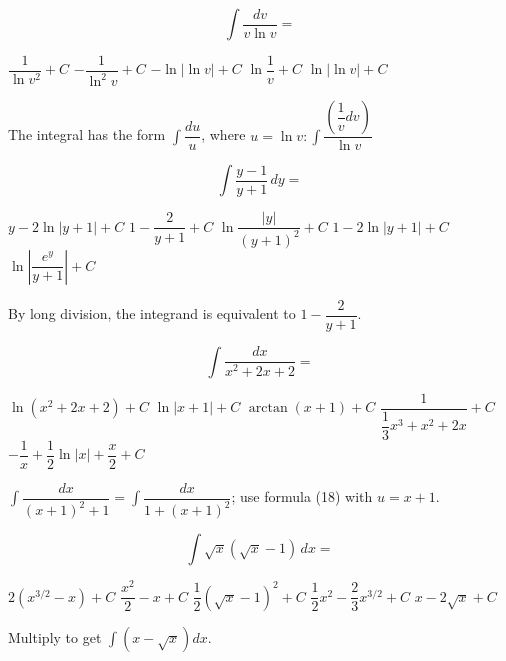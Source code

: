 \question
\[
\displaystyle\int \dfrac{d v}{v \ln v}=
\]
\begin{choices}
  \choice $\dfrac{1}{\ln v^{2}}+C$
  \choice $-\dfrac{1}{\ln ^{2} v}+C$
  \choice $-\ln |\ln v|+C$
  \choice $\ln \dfrac{1}{v}+C$
  \CorrectChoice $\ln |\ln v|+C$
\end{choices}
\begin{solution}
The integral has the form $\displaystyle\int \dfrac{d u}{u}$, where $u=\ln v: \displaystyle\int \dfrac{\left(\dfrac{1}{v} d v\right)}{\ln v}$
\end{solution}



\newpage


\question
\[
\displaystyle\int \dfrac{y-1}{y+1} \,dy=
\]
\begin{choices}
  \CorrectChoice $y-2 \ln |y+1|+C$
  \choice $1-\dfrac{2}{y+1}+C$
  \choice $\ln \dfrac{|y|}{(y+1)^{2}}+C$
  \choice $1-2 \ln |y+1|+C$
  \choice $\ln \left|\dfrac{e^{y}}{y+1}\right|+C$
\end{choices}
\begin{solution}
By long division, the integrand is equivalent to $1-\dfrac{2}{y+1}$.
\end{solution}

\question
\[
\displaystyle\int \dfrac{d x}{x^{2}+2 x+2}=
\]
\begin{choices}
  \choice $\ln \left(x^{2}+2 x+2\right)+C$
  \choice $\ln |x+1|+C$
  \CorrectChoice $\arctan (x+1)+C$
  \choice $\dfrac{1}{\dfrac{1}{3} x^{3}+x^{2}+2 x}+C$
  \choice $-\dfrac{1}{x}+\dfrac{1}{2} \ln |x|+\dfrac{x}{2}+C$
\end{choices}
\begin{solution}
$\displaystyle\int \dfrac{d x}{(x+1)^{2}+1}=\displaystyle\int \dfrac{d x}{1+(x+1)^{2}}$; use formula (18) with $u=x+1$.
\end{solution}

\question
\[
\displaystyle\int \sqrt{x}(\sqrt{x}-1) \,dx=
\]
\begin{choices}
  \choice $2\left(x^{3 / 2}-x\right)+C$
  \choice $\dfrac{x^{2}}{2}-x+C$
  \choice $\dfrac{1}{2}(\sqrt{x}-1)^{2}+C$
  \CorrectChoice $\dfrac{1}{2} x^{2}-\dfrac{2}{3} x^{3 / 2}+C$
  \choice $x-2 \sqrt{x}+C$
\end{choices}
\begin{solution}
Multiply to get $\displaystyle\int(x-\sqrt{x}) d x$.
\end{solution}



\newpage



